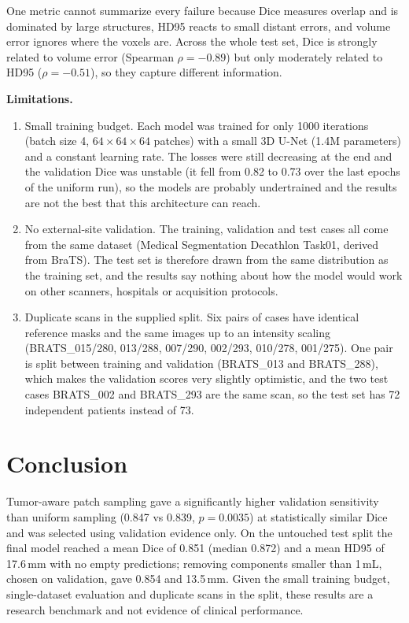 \documentclass[10pt,a4paper]{article}
\begin{document}
One metric cannot summarize every failure because Dice measures overlap and is dominated by large structures, HD95 reacts to small distant errors, and volume error ignores where the voxels are. Across the whole test set, Dice is strongly related to volume error (Spearman $\rho=-0.89$) but only moderately related to HD95 ($\rho=-0.51$), so they capture different information.

\textbf{Limitations.}
\begin{enumerate}
\item Small training budget. Each model was trained for only 1000 iterations (batch size 4, $64\times64\times64$ patches) with a small 3D U-Net (1.4M parameters) and a constant learning rate. The losses were still decreasing at the end and the validation Dice was unstable (it fell from 0.82 to 0.73 over the last epochs of the uniform run), so the models are probably undertrained and the results are not the best that this architecture can reach.
\item No external-site validation. The training, validation and test cases all come from the same dataset (Medical Segmentation Decathlon Task01, derived from BraTS). The test set is therefore drawn from the same distribution as the training set, and the results say nothing about how the model would work on other scanners, hospitals or acquisition protocols.
\item Duplicate scans in the supplied split. Six pairs of cases have identical reference masks and the same images up to an intensity scaling (BRATS\_015/280, 013/288, 007/290, 002/293, 010/278, 001/275). One pair is split between training and validation (BRATS\_013 and BRATS\_288), which makes the validation scores very slightly optimistic, and the two test cases BRATS\_002 and BRATS\_293 are the same scan, so the test set has 72 independent patients instead of 73.
\end{enumerate}

\section{Conclusion}
Tumor-aware patch sampling gave a significantly higher validation sensitivity than uniform sampling (0.847 vs 0.839, $p=0.0035$) at statistically similar Dice and was selected using validation evidence only. On the untouched test split the final model reached a mean Dice of 0.851 (median 0.872) and a mean HD95 of 17.6\,mm with no empty predictions; removing components smaller than 1\,mL, chosen on validation, gave 0.854 and 13.5\,mm. Given the small training budget, single-dataset evaluation and duplicate scans in the split, these results are a research benchmark and not evidence of clinical performance.
\end{document}
